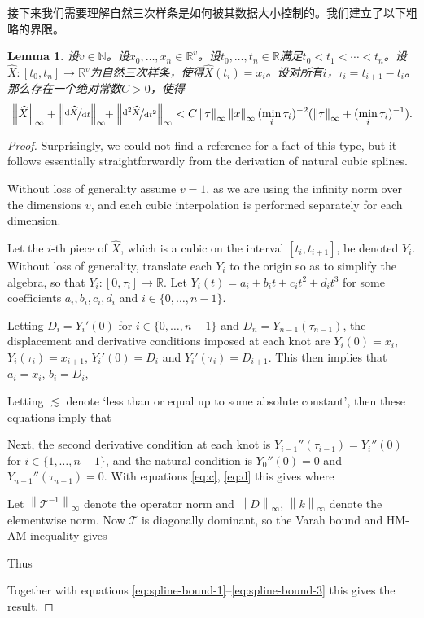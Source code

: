 \documentclass{ctexart}
\theoremstyle{plain}
\newtheorem{lemma}[thm]{Lemma}
\theoremstyle{definition}
\newcommand{\norm}[1]{\left\|#1\right\|}
\newcommand{\reals}{\mathbb{R}}
\newcommand{\naturals}{\mathbb{N}}
\newcommand{\ttfrac}[2]{\nicefrac{#1}{#2}}
\begin{document}
	接下来我们需要理解自然三次样条是如何被其数据大小控制的。我们建立了以下粗略的界限。
\begin{lemma}\label{lemma:spline-bound}
	设$v \in \naturals$。设$x_0, \ldots, x_n \in \reals^v$。设$t_0, \ldots, t_n \in \reals$满足$t_0 < t_1 < \cdots < t_n$。设$\widehat{X} \colon [t_0, t_n] \to \reals^v$为自然三次样条，使得$\widehat{X}(t_i) = x_i$。设对所有$i$，$\tau_i = t_{i + 1}-t_i$。那么存在一个绝对常数$C > 0$，使得
\begin{equation*}
	\norm{\widehat{X}}_\infty + \norm{\ttfrac{\mathrm{d}\widehat{X}}{\mathrm{d}t}}_\infty \!\!+ \norm{\ttfrac{\mathrm{d}^2\widehat{X}}{\mathrm{d}t^2}}_\infty < C \norm{\tau}_\infty \norm{x}_\infty (\min_i \tau_i)^{-2} (\norm{\tau}_\infty + (\min_i \tau_i)^{-1}).
\end{equation*}
\end{lemma}
\begin{proof}
	Surprisingly, we could not find a reference for a fact of this type, but it follows essentially straightforwardly from the derivation of natural cubic splines.
	
	Without loss of generality assume $v = 1$, as we are using the infinity norm over the dimensions $v$, and each cubic interpolation is performed separately for each dimension.
	
	Let the $i$-th piece of $\widehat{X}$, which is a cubic on the interval $[t_i, t_{i + 1}]$, be denoted $Y_i$. Without loss of generality, translate each $Y_i$ to the origin so as to simplify the algebra, so that $Y_i \colon [0, \tau_i] \to \reals$. Let $Y_i(t) = a_i + b_i t + c_i t^2 + d_i t^3$ for some coefficients $a_i, b_i, c_i, d_i$ and $i \in \{0, \ldots, n-1\}$.
	
	Letting $D_i = Y_i'(0)$ for $i \in \{0, \ldots, n-1\}$ and $D_n = Y_{n-1}(\tau_{n-1})$, the displacement and derivative conditions imposed at each knot are $Y_i(0) = x_i$, $Y_i(\tau_i) = x_{i + 1}$, $Y_i'(0) = D_i$ and $Y_i'(\tau_i) = D_{i + 1}$. This then implies that $a_i = x_i$, $b_i = D_i$,
	
	Letting $\lesssim$ denote `less than or equal up to some absolute constant', then these equations imply that
	
	Next, the second derivative condition at each knot is $Y_{i-1}''(\tau_{i-1}) = Y_i''(0)$ for $i \in \{1, \ldots, n-1\}$, and the natural condition is $Y_0''(0) = 0$ and $Y_{n-1}''(\tau_{n-1}) = 0$. With equations \eqref{eq:c}, \eqref{eq:d} this gives
	where
	
	Let $\norm{\mathcal{T}^{-1}}_\infty$ denote the operator norm and $\norm{D}_\infty$, $\norm{k}_\infty$ denote the elementwise norm. Now $\mathcal{T}$ is diagonally dominant, so the Varah bound \cite{varah} and HM-AM inequality gives
	
	Thus
	
	Together with equations \eqref{eq:spline-bound-1}--\eqref{eq:spline-bound-3} this gives the result.
\end{proof}
\end{document}
